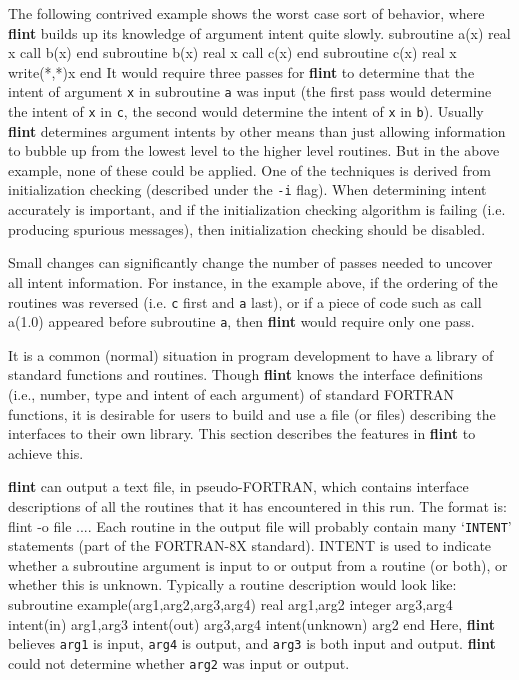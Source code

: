 The following contrived example shows the worst case sort of behavior,
where {\bf flint} builds up its knowledge of argument intent quite slowly.
{\ninepoint\begintt
     subroutine a(x)
     real x
     call b(x)
     end
     subroutine b(x)
     real x
     call c(x)
     end
     subroutine c(x)
     real x
     write(*,*)x
     end
\endtt}
It would require three passes for {\bf flint} to determine that the
intent of argument {\tt x} in subroutine {\tt a} was input (the first
pass would determine the intent of {\tt x} in {\tt c}, the second would
determine the intent of {\tt x} in {\tt b}). Usually {\bf flint} determines
argument intents by other means than just allowing information to bubble
up from the lowest level to the higher level routines. But in the above
example, none of these could be applied. One of the techniques is
derived from initialization checking (described under the {\tt -i} flag).
When determining intent accurately is important, and if the initialization
checking algorithm is failing (i.e. producing spurious messages), then
initialization checking should be disabled.

Small changes can significantly change the number of passes needed to
uncover all intent information. For instance, in the example above,
if the ordering of the routines was reversed (i.e. {\tt c} first and {\tt a}
last), or if a piece of code such as
{\ninepoint\begintt
      call a(1.0)
\endtt}
appeared before subroutine {\tt a}, then {\bf flint} would require only
one pass.


It is a common (normal) situation
in program development to have a library of standard functions and
routines. Though {\bf flint} knows the interface definitions (i.e.,
number, type and intent of each argument) of standard FORTRAN
functions, it is desirable for users to build and use a file (or
files) describing the interfaces to their own library.  This section
describes the features in {\bf flint} to achieve this.

{\bf flint} can output a text file, in pseudo-FORTRAN, which contains
interface descriptions of all the routines that it has encountered in
this run. The format is:
{\ninepoint\begintt
     flint -o file ....
\endtt}
Each routine in the output file will probably contain many `{\tt INTENT}'
statements (part of the FORTRAN-8X standard). INTENT is used to indicate
whether a subroutine argument is input to or output from a routine (or both),
or whether this is unknown. Typically a routine description would look
like:
{\ninepoint\begintt
      subroutine example(arg1,arg2,arg3,arg4)
      real arg1,arg2
      integer arg3,arg4
      intent(in) arg1,arg3
      intent(out) arg3,arg4
      intent(unknown) arg2
      end
\endtt}
Here, {\bf flint} believes {\tt arg1} is input, {\tt arg4} is output,
and {\tt arg3} is both input and output.  {\bf flint} could not
determine whether {\tt arg2} was input or output.

